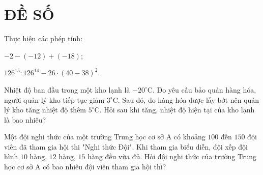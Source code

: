 \section{ĐỀ SỐ \thesection}%
\setcounter{bt}{0}
\begin{bt} Thực hiện các phép tính:
	\begin{listEX}[2]
		\item $-2-(-12)+(-18)$;
		\item $126^{15}: 126^{14}-26 \cdot(40-38)^{2}$.
	\end{listEX}
\end{bt}

\begin{bt} Nhiệt độ ban đầu trong một kho lạnh là $-20^{\circ} \mathrm{C}$. Do yêu cầu bảo quản hàng hóa, người quản lý kho tiếp tục giảm $3^{\circ} \mathrm{C}$. Sau đó, do hàng hóa được lấy bớt nên quản lý kho tăng nhiệt độ thêm $5^{\circ} \mathrm{C}$. Hỏi sau khi tăng, nhiệt độ hiện tại của kho lạnh là bao nhiêu?
	
\end{bt}


\begin{bt}  Một đội nghi thức của một trường Trung học cơ sở A có khoảng $100$ đến $150$ đội viên đã tham gia hội thi "Nghi thức Đội". Khi tham gia biểu diễn, đội xếp đội hình $10$ hàng, $12$ hàng, $15$ hàng đều vừa đủ. Hỏi đội nghi thức của trường Trung học cơ sở A có bao nhiêu đội viên tham gia hội thi?
\end{bt}


